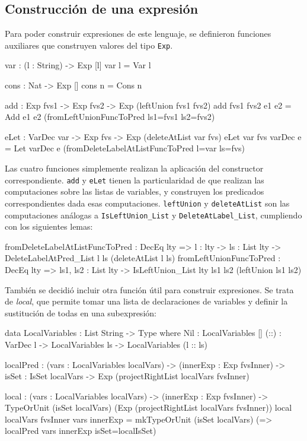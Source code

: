 \subsection{Construcción de una expresión}

Para poder construir expresiones de este lenguaje, se definieron funciones auxiliares que construyen valores del tipo \texttt{Exp}.

\begin{code}
var : (l : String) -> Exp [l]
var l = Var l

cons : Nat -> Exp []
cons n = Cons n

add : Exp fvs1 -> Exp fvs2 -> Exp (leftUnion fvs1 fvs2)
add {fvs1} {fvs2} e1 e2 = Add e1 e2
  (fromLeftUnionFuncToPred {ls1=fvs1} {ls2=fvs2})

eLet : VarDec var -> Exp fvs -> Exp (deleteAtList var fvs)
eLet {var} {fvs} varDec e = Let varDec e 
  (fromDeleteLabelAtListFuncToPred {l=var} {ls=fvs})
\end{code}

Las cuatro funciones simplemente realizan la aplicación del constructor correspondiente. \texttt{add} y \texttt{eLet} tienen la particularidad de que realizan las computaciones sobre las listas de variables, y construyen los predicados correspondientes dada esas computaciones. \texttt{leftUnion} y \texttt{deleteAtList} son las computaciones análogas a \texttt{IsLeftUnion\_List} y \texttt{DeleteAtLabel\_List}, cumpliendo con los siguientes lemas:

\begin{code}
fromDeleteLabelAtListFuncToPred : DecEq lty => {l : lty} -> 
  {ls : List lty} -> 
  DeleteLabelAtPred_List l ls (deleteAtList l ls)
fromLeftUnionFuncToPred : DecEq lty => {ls1, ls2 : List lty} -> 
  IsLeftUnion_List {lty} ls1 ls2 (leftUnion ls1 ls2)   
\end{code}

También se decidió incluir otra función útil para construir expresiones. Se trata de \textit{local}, que permite tomar una lista de declaraciones de variables y definir la sustitución de todas en una subexpresión:

\begin{code}
data LocalVariables : List String -> Type where
  Nil : LocalVariables []
  (::) : VarDec l -> LocalVariables ls -> 
    LocalVariables (l :: ls) 

localPred : (vars : LocalVariables localVars) -> 
  (innerExp : Exp fvsInner) -> {isSet : IsSet localVars} -> 
  Exp (projectRightList localVars fvsInner)

local : (vars : LocalVariables localVars) -> 
  (innerExp : Exp fvsInner) -> 
  TypeOrUnit 
    (isSet localVars) 
    (Exp (projectRightList localVars fvsInner))
local {localVars} {fvsInner} vars innerExp = 
  mkTypeOrUnit (isSet localVars)
    (\localIsSet => localPred vars innerExp {isSet=localIsSet}) 
\end{code}

